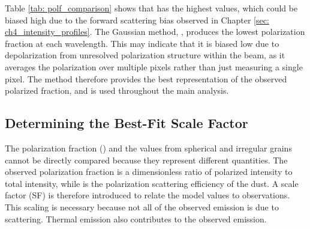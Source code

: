 Table \ref{tab: polf_comparison} shows that \POLFpoli has the highest values, which could be biased high due to the forward scattering bias observed in Chapter \ref{sec: ch4_intensity_profiles}. The Gaussian method, \POLFgaussNS, produces the lowest polarization fraction at each wavelength. This may indicate that it is biased low due to depolarization from unresolved polarization structure within the beam, as it averages the polarization over multiple pixels rather than just measuring a single pixel. The \POLFsi method therefore provides the best representation of the observed polarized fraction, and is used throughout the main analysis.















\subsection{Determining the Best-Fit Scale Factor}
The polarization fraction (\POLFsiNS) and the \Pweff values from spherical and irregular grains cannot be directly compared because they represent different quantities. The observed polarization fraction is a dimensionless ratio of polarized intensity to total intensity, while \Pweff is the polarization scattering efficiency of the dust. A scale factor (SF) is therefore introduced to relate the model values to observations. This scaling is necessary because not all of the observed emission is due to scattering. Thermal emission also contributes to the observed emission.

